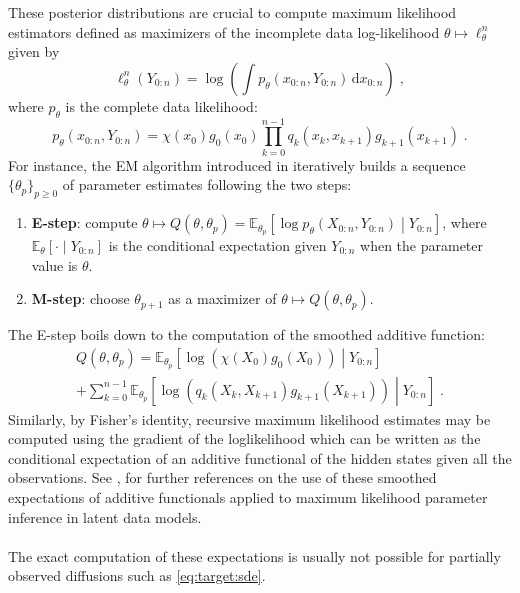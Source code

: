 \documentclass[12pt]{article}
\newcommand{\rmd}{\mathrm{d}}
\newcommand{\eqsp}{\;}
\newcommand{\1}{\mathrm{1}}
\newcommand{\qk}{q_{k}}
\begin{document}
These posterior distributions are crucial to compute maximum likelihood estimators defined as maximizers of the incomplete data log-likelihood $\theta\mapsto \ell_{\theta}^{n}$ given by
\begin{equation*}
\ell_{\theta}^{n}(Y_{0:n}) = \log\left(\int p_{\theta}(x_{0:n},Y_{0:n})\,\rmd x_{0:n}\right)\eqsp,
\end{equation*}  
where $p_{\theta}$ is the complete data likelihood:
\begin{equation*}
p_{\theta}(x_{0:n},Y_{0:n}) = \chi(x_0)g_{0}(x_0)\prod^{n-1}_{k=0}\qk(x_{k},x_{k+1})g_{k+1}(x_{k+1})\eqsp.
\end{equation*}
For instance, the EM algorithm introduced in \cite{dempster:laird:rubin:1977} iteratively builds a sequence $\{\theta_{p}\}_{p\ge 0}$ of parameter estimates following the two steps:
\begin{enumerate}
	\item {\bf E-step}: compute $\theta \mapsto Q(\theta,\theta_{p}) = \mathbb{E}_{\theta_p}\left[\log p_{\theta}(X_{0:n},Y_{0:n})\middle|Y_{0:n}\right]$, where $\mathbb{E}_{\theta}\left[\cdot\middle|Y_{0:n}\right]$ is the conditional expectation given $Y_{0:n}$ when the parameter value is $\theta$.
	\item {\bf M-step}: choose $\theta_{p+1}$ as a maximizer of $\theta \mapsto Q(\theta,\theta_{p})$.
\end{enumerate}
The E-step boils down to the computation of the smoothed additive function: 
\begin{multline*}
Q(\theta,\theta_{p}) = \mathbb{E}_{\theta_p}\left[\log \left(\chi(X_0)g_{0}(X_0)\right)\middle|Y_{0:n}\right] \\
+ \sum_{k=0}^{n-1}\mathbb{E}_{\theta_p}\left[\log \left(\qk(X_{k},X_{k+1})g_{k+1}(X_{k+1})\right)\middle|Y_{0:n}\right] \eqsp.
\end{multline*}
Similarly, by Fisher's identity, recursive maximum likelihood estimates may be computed using the gradient of the loglikelihood which can be written as the conditional expectation of an additive functional of the hidden states given all the observations.
 See \cite[Chapter $10$ and $11$]{cappe:moulines:ryden:2005}, \cite{kantas:doucet:signh:2015,doucet:poyiadjis:singh:2011,lecorff:fort:2013a,lecorff:fort:2013b}
for further references on the use of these smoothed expectations of additive functionals  applied to maximum likelihood parameter inference in latent data models.\\
\\
The exact computation of these expectations is usually not possible for partially observed diffusions such as \eqref{eq:target:sde}. 
\end{document}
